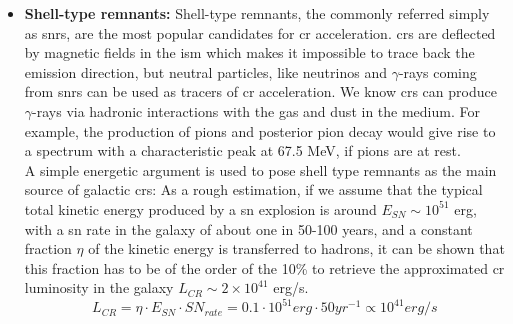 \documentclass[main.tex]{subfiles}
\begin{document}
\begin{itemize}
    \item \textbf{Shell-type remnants:} Shell-type remnants, the commonly referred simply as \glspl{snr}, are the most popular candidates for \gls{cr} acceleration. \glspl{cr} are deflected by magnetic fields in the \gls{ism} which makes it impossible to trace back the emission direction, but neutral particles, like neutrinos and $\gamma$-rays coming from \glspl{snr} can be used as tracers of \gls{cr} acceleration.
    We know \glspl{cr} can produce $\gamma$-rays via hadronic interactions with the gas and dust in the medium. For example, the production of pions and posterior pion decay would give rise to a spectrum with a characteristic peak at 67.5 MeV, if pions are at rest. \\
    A simple energetic argument is used to pose shell type remnants as the main source of galactic \glspl{cr}: As a rough estimation, if we assume that the typical total kinetic energy produced by a \gls{sn} explosion is around $E_{SN} \sim 10^{51}$ erg, with a \gls{sn} rate in the galaxy of about one in 50-100 years, and a constant fraction $\eta$ of the kinetic energy is transferred to hadrons, it can be shown that this fraction has to be of the order of the 10\% to retrieve the approximated \gls{cr} luminosity in the galaxy $L_{CR} \sim 2 \times 10^{41}$ erg/s.
    \begin{equation}
        L_{CR} = \eta \cdot E_{SN} \cdot SN_{rate} = 0.1 \cdot 10^{51} erg \cdot 50 yr^{-1} \propto 10^{41} erg/s
    \end{equation}
    

\end{itemize}
\end{document}
